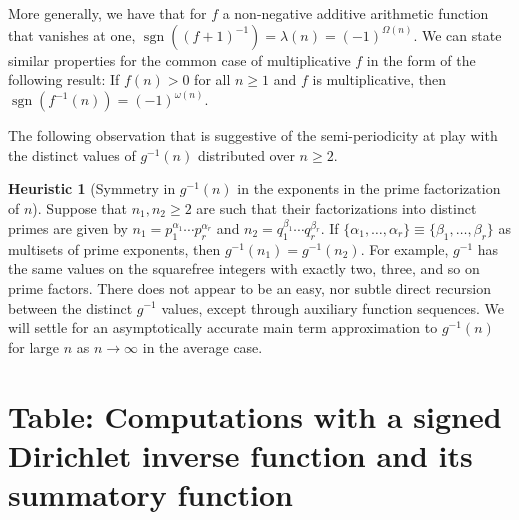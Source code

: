 \documentclass[11pt,reqno,a4letter]{article}
\numberwithin{figure}{section}
\numberwithin{table}{section}
\theoremstyle{plain}
\numberwithin{theorem}{section}
\theoremstyle{definition}
\newtheorem{heuristic}[theorem]{Heuristic}
\begin{document}
More generally, we have that for $f$ a non-negative additive arithmetic function that vanishes at one, 
$\operatorname{sgn}((f+1)^{-1}) = \lambda(n) = (-1)^{\Omega(n)}$. 
We can state similar properties for the common case of multiplicative $f$ in the 
form of the following result: If $f(n) > 0$ for all $n \geq 1$ and $f$ is multiplicative, then 
$\operatorname{sgn}(f^{-1}(n)) = (-1)^{\omega(n)}$. 


The following observation that is suggestive of the semi-periodicity at play 
with the distinct values of $g^{-1}(n)$ distributed over $n \geq 2$. 

\begin{heuristic}[Symmetry in $g^{-1}(n)$ in the exponents in the prime factorization of $n$] 
Suppose that $n_1, n_2 \geq 2$ are such that their factorizations into distinct primes are 
given by $n_1 = p_1^{\alpha_1} \cdots p_r^{\alpha_r}$ and $n_2 = q_1^{\beta_1} \cdots q_r^{\beta_r}$. 
If $\{\alpha_1, \ldots, \alpha_r\} \equiv \{\beta_1, \ldots, \beta_r\}$ as multisets of prime exponents, 
then $g^{-1}(n_1) = g^{-1}(n_2)$. For example, $g^{-1}$ has the same values on the squarefree integers 
with exactly two, three, and so on prime factors. There does not appear to be an easy, nor subtle 
direct recursion between the distinct $g^{-1}$ values, except through auxiliary function sequences. 
We will settle for an asymptotically accurate main term approximation to $g^{-1}(n)$ for large $n$ as 
$n \rightarrow \infty$ in the average case. 
\end{heuristic} 

\newpage 
\renewcommand{\refname}{References} 
{}


\newpage
\setcounter{section}{0} 
\renewcommand{\thesection}{T.\arabic{section}} 

\newpage
\section{Table: Computations with a signed Dirichlet inverse function and its summatory function} 
\label{table_conjecture_Mertens_ginvSeq_approx_values}
\end{document}

